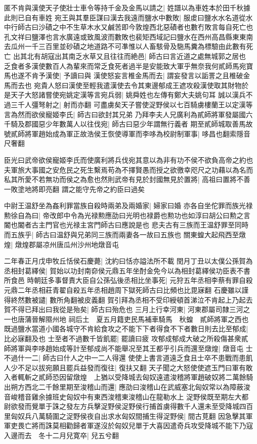 匿不肯與漢使天子使壯士車令等持千金及金馬以請之|{
	姓譜以為車姓本於田千秋據此則已自有車姓}
宛王與其羣臣謀曰漢去我遠而鹽水中數敗|{
	服䖍曰鹽水水名道從水中行師古曰沙磧之中不生草木水又鹹苦即今敦煌西北惡磧者也數冇敗言每自死亡也孔文祥曰鹽澤也言水廣遠或致風波而數敗也裴矩西域記曰鹽水在西州高昌縣東東南去瓜州一千三百里並砂磧之地道路不可凖惟以人畜駭骨及駞馬糞為標驗由此數有死亡}
出其北有胡寇出其南乏水草又且往往而絶邑|{
	師古曰言近道之處無城郭之居也}
乏食者多漢使數百人為輩來而常乏食死者過半是安能致大軍乎無奈我何貳師馬宛寶馬也遂不肯予漢使|{
	予讀曰與}
漢使怒妄言椎金馬而去|{
	謂妄發言以詬詈之且椎破金馬而去也}
宛貴人怒曰漢使至輕我遣漢使去令其東邊郁成王遮攻殺漢使取其財物於是天子大怒諸嘗使宛姚定漢等言宛兵弱|{
	姚舜姓也左傳有鄭大夫姚句耳}
誠以漢兵不過三千人彊弩射之|{
	射而亦翻}
可盡虜矣天子嘗使浞野侯以七百騎虜樓蘭王以定漢等言為然而欲侯寵姬李氏|{
	師古曰欲封其兄弟}
乃拜李夫人兄廣利為貳師將軍發屬國六千騎及郡國惡少年數萬人以往伐宛|{
	師古曰惡少年謂無行義者}
期至貳師城取善馬故號貳師將軍趙始成為軍正故浩侯王恢使導軍而李哆為校尉制軍事|{
	哆昌也翻索隱音尺奢翻}


臣光曰武帝欲侯寵姬李氏而使廣利將兵伐宛其意以為非有功不侯不欲負高帝之約也夫軍旅大事國之安危民之死生繫焉苟為不擇賢愚而授之欲徼幸咫尺之功藉以為名而私其所愛不若無功而侯之為愈也然則武帝有見於封國無見於置將|{
	高祖曰置將不善一敗塗地將即亮翻}
謂之能守先帝之約臣曰過矣

中尉王温舒坐為姦利罪當族自殺時兩弟及兩婚家|{
	婦家曰婚}
亦各自坐佗罪而族光禄勲徐自為曰|{
	帝改郎中令為光禄勲應劭曰光明也禄爵也勲功也如淳曰胡公曰勲之言閽也閽者古主門官也光禄主宮門師古曰應說是也}
悲夫古有三族而王温舒罪至同時而五族乎|{
	師古曰温舒與兄弟同三族而兩妻各一故曰五族也}
關東蝗大起飛西至燉煌|{
	燉煌郡屬凉州唐瓜州沙州地燉音屯}


二年春正月戊申牧丘恬侯石慶薨|{
	沈約曰恬亦謚法所不載}
閏月丁丑以太僕公孫賀為丞相封葛繹侯|{
	賀始以功封南奅侯元鼎五年坐酎金免今以為相封葛繹侯功臣表不書所食邑}
時朝廷多事督責大臣自公孫弘後丞相比坐事死|{
	元狩五年丞相李蔡有罪自殺元鼎二年丞相莊青翟自殺五年丞相趙周下獄死師古曰比頻也比毘寐翻}
石慶雖以謹得終然數被譴|{
	數所角翻被皮義翻}
賀引拜為丞相不受印綬頓首涕泣不肯起上乃起去賀不得已拜出曰我從是殆矣|{
	師古曰殆危也}
三月上行幸河東|{
	河東郡屬司隸三河之一也唐蒲晉解隰州地}
祠后土　夏五月籍吏民馬補車騎馬　秋蝗　貳師將軍之西也既過鹽水當道小國各城守不肯給食攻之不能下下者得食不下者數日則去比至郁成|{
	比必寐翻及也}
士至者不過數千皆飢罷|{
	罷讀曰疲}
攻郁成郁成大破之所殺傷甚衆貳師將軍與李哆趙始成等計至郁成尚不能舉况至其王都乎引兵而還至燉煌|{
	燉音屯}
士不過什一二|{
	師古曰什人之中一二人得還}
使使上書言道遠乏食且士卒不患戰而患飢人少不足以拔宛願且罷兵益發而復往|{
	復扶又翻}
天子聞之大怒使使遮玉門曰軍有敢入者輒斬之貳師恐因留燉煌　上猶以受降城去匈奴遠遣浚稽將軍趙破奴將二萬餘騎出朔方西北二千餘里期至浚稽山而還|{
	應劭曰浚稽山在武威塞北匈奴常以為障蔽浚音峻稽音雞余據班史匈奴中有東西浚稽東浚稽山在龍勒水上}
浞野侯既至期左大都尉欲發而覺單于誅之發左方兵擊浞野侯浞野侯行捕首虜得數千人還未至受降城四百里匈奴兵八萬騎圍之浞野侯夜自出求水匈奴間捕生得浞野侯|{
	間古莧翻}
因急擊其軍軍吏畏亡將而誅莫相勸歸者軍遂沒於匈奴兒單于大喜因遣奇兵攻受降城不能下乃寇入邊而去　冬十二月兒寛卒|{
	兒五兮翻}


